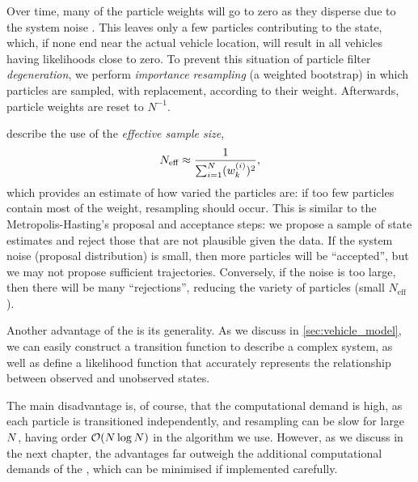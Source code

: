 Over time, many of the particle weights will go to zero as they disperse due to the system noise \citep{Doucet_2000}. This leaves only a few particles contributing to the state, which, if none end near the actual vehicle location, will result in all vehicles having likelihoods close to zero. To prevent this situation of particle filter \emph{degeneration}, we perform \emph{importance resampling} (a weighted bootstrap) in which particles are sampled, with replacement, according to their weight. Afterwards, particle weights are reset to $N^{-1}$.

\citet{Doucet_2000} describe the use of the \emph{effective sample size},
\begin{equation}
    \label{eq:Neff}
    N_{\text{eff}} \approx \frac{1}{\sum_{i=1}^N (w_k^{(i)})^2},
\end{equation}
which provides an estimate of how varied the particles are: if too few particles contain most of the weight, resampling should occur. This is similar to the Metropolis-Hasting's proposal and acceptance steps: we propose a sample of state estimates and reject those that are not plausible given the data. If the system noise (proposal distribution) is small, then more particles will be ``accepted'', but we may not propose sufficient trajectories. Conversely, if the noise is too large, then there will be many ``rejections'', reducing the variety of particles (small $N_\text{eff}$).

Another advantage of the \pf{} is its generality. As we discuss in \cref{sec:vehicle_model}, we can easily construct a transition function to describe a complex system, as well as define a likelihood function that accurately represents the relationship between observed and unobserved states.

The main disadvantage is, of course, that the computational demand is high, as each particle is transitioned independently, and resampling can be slow for large $N$, having order $\mathcal{O}(N\log N)$ in the  algorithm we use. However, as we discuss in the next chapter, the advantages far outweigh the additional computational demands of the \pf{}, which can be minimised if implemented carefully.
